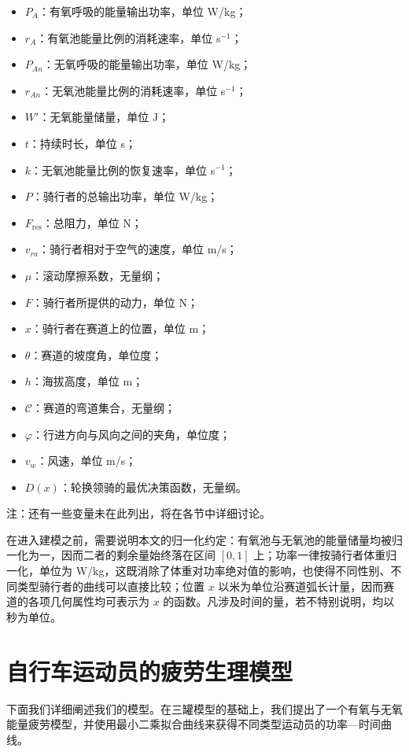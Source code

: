 \documentclass[11pt,a4paper]{ctexart}
\begin{document}
\begin{itemize}
\item $P_A$：有氧呼吸的能量输出功率，单位 W/kg；
\item $r_A$：有氧池能量比例的消耗速率，单位 s$^{-1}$；
\item $P_{An}$：无氧呼吸的能量输出功率，单位 W/kg；
\item $r_{An}$：无氧池能量比例的消耗速率，单位 s$^{-1}$；
\item $W'$：无氧能量储量，单位 J；
\item $t$：持续时长，单位 s；
\item $k$：无氧池能量比例的恢复速率，单位 s$^{-1}$；
\item $P$：骑行者的总输出功率，单位 W/kg；
\item $F_{\mathrm{res}}$：总阻力，单位 N；
\item $v_{ra}$：骑行者相对于空气的速度，单位 m/s；
\item $\mu$：滚动摩擦系数，无量纲；
\item $F$：骑行者所提供的动力，单位 N；
\item $x$：骑行者在赛道上的位置，单位 m；
\item $\theta$：赛道的坡度角，单位度；
\item $h$：海拔高度，单位 m；
\item $\mathcal{C}$：赛道的弯道集合，无量纲；
\item $\varphi$：行进方向与风向之间的夹角，单位度；
\item $v_w$：风速，单位 m/s；
\item $D(x)$：轮换领骑的最优决策函数，无量纲。
\end{itemize}

注：还有一些变量未在此列出，将在各节中详细讨论。

在进入建模之前，需要说明本文的归一化约定：有氧池与无氧池的能量储量均被归一化为一，因而二者的剩余量始终落在区间 $[0,1]$ 上；功率一律按骑行者体重归一化，单位为 W/kg，这既消除了体重对功率绝对值的影响，也使得不同性别、不同类型骑行者的曲线可以直接比较；位置 $x$ 以米为单位沿赛道弧长计量，因而赛道的各项几何属性均可表示为 $x$ 的函数。凡涉及时间的量，若不特别说明，均以秒为单位。

\section{自行车运动员的疲劳生理模型}

下面我们详细阐述我们的模型。在三罐模型的基础上，我们提出了一个有氧与无氧能量疲劳模型，并使用最小二乘拟合曲线来获得不同类型运动员的功率—时间曲线。
\end{document}
